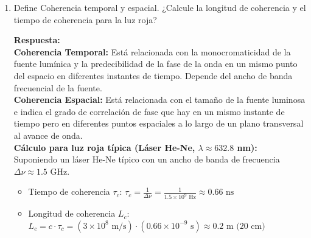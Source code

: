 \documentclass[12pt]{article}
\begin{document}
\begin{enumerate}
		\vspace{0.2cm}
		\textcolor{blue!70!black}{\textbf{Respuesta:}} \\
		Sean $I_1$ la intensidad inicial y $I_2$ la intensidad tras una deformación que induce un cambio de fase $\Delta\phi$:
		\[ I_1 = I_o + I_r + 2\sqrt{I_o I_r}\cos(\phi) \]
		\[ I_2 = I_o + I_r + 2\sqrt{I_o I_r}\cos(\phi + \Delta\phi) \]
		
		\textbf{Correlación por suma:}
		\[ I_{\text{suma}} = I_1 + I_2 = 2(I_o + I_r) + 2\sqrt{I_o I_r}[\cos(\phi) + \cos(\phi + \Delta\phi)] \]
		Usando la identidad trigonométrica $\cos A + \cos B = 2\cos\left(\frac{A+B}{2}\right)\cos\left(\frac{A-B}{2}\right)$:
		\[ I_{\text{suma}} = 2(I_o + I_r) + 4\sqrt{I_o I_r}\cos\left(\phi + \frac{\Delta\phi}{2}\right)\cos\left(\frac{\Delta\phi}{2}\right) \]
		
		\textbf{Correlación por substracción:}
		\[ I_{\text{resta}} = |I_1 - I_2| = |2\sqrt{I_o I_r}[\cos(\phi) - \cos(\phi + \Delta\phi)]| \]
		Usando la identidad $\cos A - \cos B = -2\sin\left(\frac{A+B}{2}\right)\sin\left(\frac{A-B}{2}\right)$:
		\[ I_{\text{resta}} = \left| -4\sqrt{I_o I_r}\sin\left(\phi + \frac{\Delta\phi}{2}\right)\sin\left(\frac{\Delta\phi}{2}\right) \right| \]
		Para ambas, las franjas de correlación de baja frecuencia que observamos vienen dictadas por los términos $\cos(\Delta\phi/2)$ y $\sin(\Delta\phi/2)$ respectivamente.
		
		\vspace{0.5cm}
		\item Define Coherencia temporal y espacial. ¿Calcule la longitud de coherencia y el tiempo de coherencia para la luz roja?
		
		\vspace{0.2cm}
		\textcolor{blue!70!black}{\textbf{Respuesta:}} \\
		\textbf{Coherencia Temporal:} Está relacionada con la monocromaticidad de la fuente lumínica y la predecibilidad de la fase de la onda en un mismo punto del espacio en diferentes instantes de tiempo. Depende del ancho de banda frecuencial de la fuente.\\
		\textbf{Coherencia Espacial:} Está relacionada con el tamaño de la fuente luminosa e indica el grado de correlación de fase que hay en un mismo instante de tiempo pero en diferentes puntos espaciales a lo largo de un plano transversal al avance de onda.\\
		\textbf{Cálculo para luz roja típica (Láser He-Ne, $\lambda \approx 632.8$ nm):} \\
		Suponiendo un láser He-Ne típico con un ancho de banda de frecuencia $\Delta\nu \approx 1.5$ GHz.
		\begin{itemize}
			\item Tiempo de coherencia $\tau_c$: $\tau_c = \frac{1}{\Delta\nu} = \frac{1}{1.5 \times 10^9 \text{ Hz}} \approx 0.66 \text{ ns}$
			\item Longitud de coherencia $L_c$: $L_c = c \cdot \tau_c = (3 \times 10^8 \text{ m/s}) \cdot (0.66 \times 10^{-9} \text{ s}) \approx 0.2 \text{ m (20 cm)}$
		\end{itemize}
		

\end{enumerate}
\end{document}
